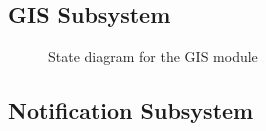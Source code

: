 \documentclass{article}
\begin{document}
		\subsection{GIS Subsystem}
		
			\begin{figure}[H]
				
				\caption{State diagram for the GIS module}
				
			\end{figure}

		\subsection{Notification Subsystem}
		
\end{document}
